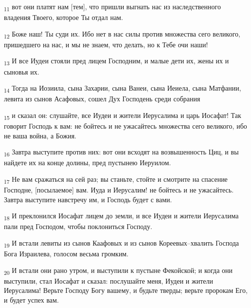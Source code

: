 \begin{tcolorbox}
\textsubscript{11} вот они платят нам [тем], что пришли выгнать нас из наследственного владения Твоего, которое Ты отдал нам.
\end{tcolorbox}
\begin{tcolorbox}
\textsubscript{12} Боже наш! Ты суди их. Ибо нет в нас силы против множества сего великого, пришедшего на нас, и мы не знаем, что делать, но к Тебе очи наши!
\end{tcolorbox}
\begin{tcolorbox}
\textsubscript{13} И все Иудеи стояли пред лицем Господним, и малые дети их, жены их и сыновья их.
\end{tcolorbox}
\begin{tcolorbox}
\textsubscript{14} Тогда на Иозиила, сына Захарии, сына Ванеи, сына Иеиела, сына Матфании, левита из сынов Асафовых, сошел Дух Господень среди собрания
\end{tcolorbox}
\begin{tcolorbox}
\textsubscript{15} и сказал он: слушайте, все Иудеи и жители Иерусалима и царь Иосафат! Так говорит Господь к вам: не бойтесь и не ужасайтесь множества сего великого, ибо не ваша война, а Божия.
\end{tcolorbox}
\begin{tcolorbox}
\textsubscript{16} Завтра выступите против них: вот они всходят на возвышенность Циц, и вы найдете их на конце долины, пред пустынею Иеруилом.
\end{tcolorbox}
\begin{tcolorbox}
\textsubscript{17} Не вам сражаться на сей раз; вы станьте, стойте и смотрите на спасение Господне, [посылаемое] вам. Иуда и Иерусалим! не бойтесь и не ужасайтесь. Завтра выступите навстречу им, и Господь будет с вами.
\end{tcolorbox}
\begin{tcolorbox}
\textsubscript{18} И преклонился Иосафат лицем до земли, и все Иудеи и жители Иерусалима пали пред Господом, чтобы поклониться Господу.
\end{tcolorbox}
\begin{tcolorbox}
\textsubscript{19} И встали левиты из сынов Каафовых и из сынов Кореевых--хвалить Господа Бога Израилева, голосом весьма громким.
\end{tcolorbox}
\begin{tcolorbox}
\textsubscript{20} И встали они рано утром, и выступили к пустыне Фекойской; и когда они выступили, стал Иосафат и сказал: послушайте меня, Иудеи и жители Иерусалима! Верьте Господу Богу вашему, и будьте тверды; верьте пророкам Его, и будет успех вам.
\end{tcolorbox}

